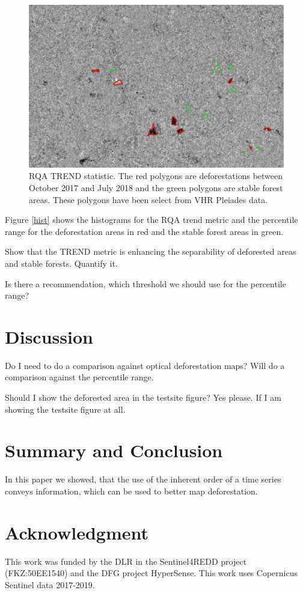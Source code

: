 \documentclass{article}
\begin{document}
\begin{figure}
  \includegraphics[width=\textwidth]{figs/TREND_Hidalgo_2016.png}
  \caption{RQA TREND statistic.  The red polygons are deforestations between October 2017 and July 2018 and the green polygons are stable forest areas.
  These polygons have been select from VHR Pleiades data.}
  \label{trend}
\end{figure}


Figure \ref{hist} shows the histograms for the RQA trend metric and the percentile range for the deforestation areas in red and the stable forest areas in green.

Show that the TREND metric is enhancing the separability of deforested areas and stable forests.
Quantify it.


Is there a recommendation, which threshold we should use for the percentile range?

\section{Discussion}

Do I need to do a comparison against optical deforestation maps?
Will do a comparison against the percentile range.

Should I show the deforested area in the testsite figure?
Yes please. If I am showing the testsite figure at all.
\section{Summary and Conclusion}
In this paper we showed, that the use of the inherent order of a time series conveys information,
which can be used to better map deforestation.



\section*{Acknowledgment}
This work was funded by the DLR in the Sentinel4REDD project (FKZ:50EE1540) and
the DFG project HyperSense.
This work uses Copernicus Sentinel data 2017-2019.




\end{document}
